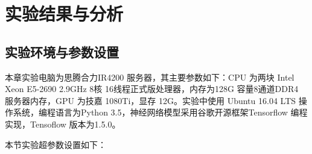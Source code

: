 

\section{实验结果与分析}
\label{sec:third}
\subsection{实验环境与参数设置}
\label{sec:third-1}
本章实验电脑为思腾合力IR4200 服务器，其主要参数如下：CPU 为两块 Intel Xeon E5-2690 2.9GHz 8核 16线程正式版处理器，内存为128G 容量8通道DDR4 服务器内存，GPU 为技嘉 1080Ti，显存 12G。实验中使用 Ubuntu 16.04 LTS 操作系统，编程语言为Python 3.5，神经网络模型采用谷歌开源框架Tensorflow 编程实现，Tensoflow 版本为1.5.0。

本节实验超参数设置如下：


